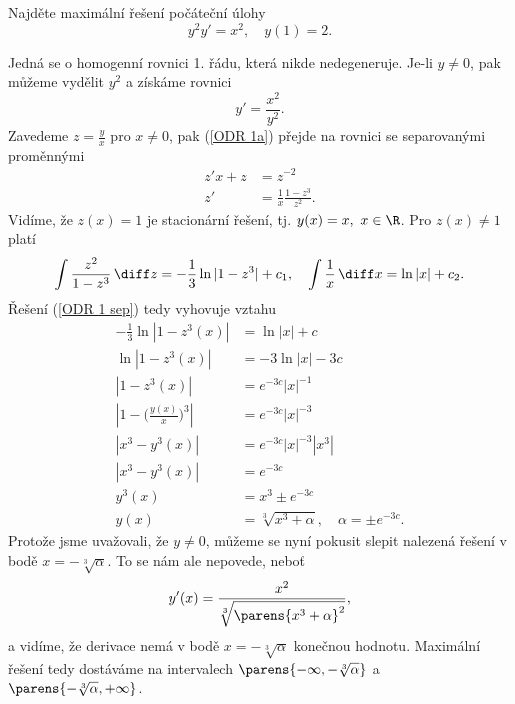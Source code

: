 \documentclass[answers]{exam}
\begin{document}
\begin{questions}
\begin{solution}
\begin{enumerate}[label=(\roman*)]
	\end{enumerate}  
	
  \end{solution}
  
  \question
  Najd\v ete  maxim\'aln\'i \v re\v sen\'i počáteční úlohy
  \begin{equation*}
  y^2y'=x^2,
  \quad 
  y(1)=2. 
  \end{equation*}
  
  \begin{solution}
		Jedn\'a se o homogenn\'i rovnici 1. \v r\'adu, kter\'a nikde nedegeneruje. Je-li $y\ne0$, pak m\r u\v zeme vyd\v elit $y^2$ a z\'isk\'ame rovnici
		\begin{equation}\label{ODR 1a}
		y'=\frac{x^2}{y^2}. 
		\end{equation}
		Zavedeme $z=\frac{y}{x}$ pro $x\ne0$, pak (\ref{ODR 1a}) p\v rejde na rovnici se separovan\'ymi prom\v enn\'ymi
		\begin{align}\label{ODR 1 sep}
		z'x+z&=z^{-2}\nonumber\\
		z'&=\frac{1}{x}\frac{1-z^3}{z^2}.
		\end{align}	
		Vid\'ime, \v ze $z(x)=1$ je stacion\'arn\'i \v re\v sen\'i, tj. $y(x)=x,\ x\in\R$. Pro $z(x)\ne1$ plat\'i
		\begin{align*}
		\int\frac{z^2}{1-z^3}\, \diff z=-\frac{1}{3}\ln|1-z^3|+c_1,\quad \int\frac{1}{x}\,\diff x=\ln|x|+c_2. 
		\end{align*}
		\v Re\v sen\'i (\ref{ODR 1 sep}) tedy vyhovuje vztahu
		\begin{align*}
		-\frac{1}{3}\ln|1-z^3(x)|&=\ln|x|+c\\ 
		\ln|1-z^3(x)|&=-3\ln|x|-3c\\ 
		|1-z^3(x)|&=e^{-3c}|x|^{-1}\\
		|1-\big(\frac{y(x)}{x}\big)^3|&=e^{-3c}|x|^{-3}\\
		|x^3-y^3(x)|&=e^{-3c}|x|^{-3}|x^3|\\
		|x^3-y^3(x)|&=e^{-3c}\\
		y^3(x)&=x^3\pm e^{-3c}\\
		y(x)&=\sqrt[3]{x^3+\alpha},\quad \alpha=\pm e^{-3c}.
		\end{align*}
		Protože jsme uvažovali, že $y \neq 0$, můžeme se nyní pokusit slepit nalezená řešení v bodě $x = - \sqrt[3]{\alpha}$. To se nám ale nepovede, neboť
		\begin{equation*}
			y'(x)
			=
			\frac{x^2}{\sqrt[3]{\parens{x^3 + \alpha}^2}},
		\end{equation*} 
		a vidíme, že derivace nemá v bodě $x = - \sqrt[3]{\alpha}$ konečnou hodnotu. Maximální řešení tedy dostáváme na intervalech $\parens{-\infty, -\sqrt[3]{\alpha}}$ a $\parens{-\sqrt[3]{\alpha}, +\infty}$.
		

\end{solution}
\end{questions}
\end{document}
